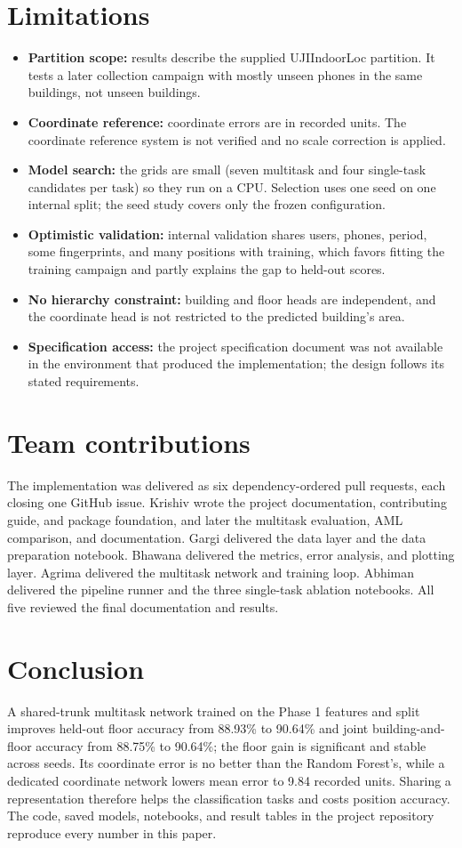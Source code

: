\documentclass[conference]{IEEEtran}
\begin{document}
\section{Limitations}
\begin{itemize}
  \item \textbf{Partition scope:} results describe the supplied UJIIndoorLoc partition. It tests a later collection campaign with mostly unseen phones in the same buildings, not unseen buildings.
  \item \textbf{Coordinate reference:} coordinate errors are in recorded units. The coordinate reference system is not verified and no scale correction is applied.
  \item \textbf{Model search:} the grids are small (seven multitask and four single-task candidates per task) so they run on a CPU. Selection uses one seed on one internal split; the seed study covers only the frozen configuration.
  \item \textbf{Optimistic validation:} internal validation shares users, phones, period, some fingerprints, and many positions with training, which favors fitting the training campaign and partly explains the gap to held-out scores.
  \item \textbf{No hierarchy constraint:} building and floor heads are independent, and the coordinate head is not restricted to the predicted building's area.
  \item \textbf{Specification access:} the project specification document was not available in the environment that produced the implementation; the design follows its stated requirements.
\end{itemize}

\section{Team contributions}
The implementation was delivered as six dependency-ordered pull requests, each closing one GitHub issue. Krishiv wrote the project documentation, contributing guide, and package foundation, and later the multitask evaluation, AML comparison, and documentation. Gargi delivered the data layer and the data preparation notebook. Bhawana delivered the metrics, error analysis, and plotting layer. Agrima delivered the multitask network and training loop. Abhiman delivered the pipeline runner and the three single-task ablation notebooks. All five reviewed the final documentation and results.

\section{Conclusion}
A shared-trunk multitask network trained on the Phase 1 features and split improves held-out floor accuracy from 88.93\% to 90.64\% and joint building-and-floor accuracy from 88.75\% to 90.64\%; the floor gain is significant and stable across seeds. Its coordinate error is no better than the Random Forest's, while a dedicated coordinate network lowers mean error to 9.84 recorded units. Sharing a representation therefore helps the classification tasks and costs position accuracy. The code, saved models, notebooks, and result tables in the project repository reproduce every number in this paper.
\end{document}
